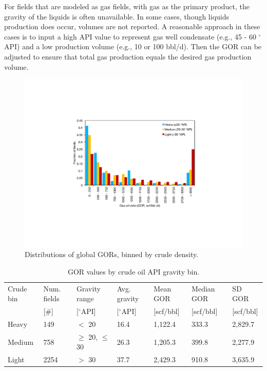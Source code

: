 \documentclass[11pt]{report}
\begin{document}
For fields that are modeled as gas fields, with gas as the primary product, the gravity of the liquids is often unavailable. In some cases, though liquids production does occur, volumes are not reported. A reasonable approach in these cases is to input a high API value to represent gas well condensate (e.g., 45 - 60 $^\circ$API) and a low production volume (e.g., 10 or 100 bbl/d). Then the GOR can be adjusted to ensure that total gas production equals the desired gas production volume.
 


\begin{figure}
\includegraphics[width=0.8\columnwidth]{images/API-GOR.pdf}
\caption{Distributions of global GORs, binned by crude density.}
\label{fig:API-GOR}
\end{figure}

\begin{table}
\begin{scriptsize}
\caption{GOR values by crude oil API gravity bin.}
\label{tab:GOR_averages}
\begin{tabular*}{1\columnwidth}{p{}p{}p{}p{}p{}p{}p{}}
\toprule
Crude bin & Num. fields & Gravity range & Avg. gravity & Mean GOR & Median GOR & SD GOR \\
& [\#] & [$^\circ$API] & [$^\circ$API] & [scf/bbl] & [scf/bbl] & [scf/bbl] \\
\midrule
Heavy & 149 & $<$ 20 & 16.4 & 1,122.4 & 333.3 & 2,829.7 \\
Medium & 758 & $\geq$ 20, $\leq$ 30 & 26.3 & 1,205.3 & 399.8 & 2,277.9 \\
Light & 2254 & $>$ 30 & 37.7 & 2,429.3 & 910.8 & 3,635.9 \\
\bottomrule
\end{tabular*}
\end{scriptsize}
\end{table}
\end{document}

